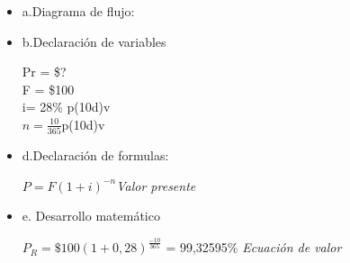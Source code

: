 	\begin{itemize}
		\item a.Diagrama de flujo:\\
		
		\item b.Declaración de variables

			Pr = \$?\\ F = \$100\\ i= 28\% p(10d)v \\$n= \frac{10}{365}$p(10d)v\\

		\item d.Declaración de formulas:\
		
			$P=F(1+i    )^{-n}$\hspace{35}\textit{Valor presente}\\
		
		\item e. Desarrollo matemático
	
			$P_{R}=\$100 (1+0,28)^\frac{-10}{365}$ = 99,32595\% \hspace{35}\textit{Ecuación de valor}\\
	

\end{itemize}
